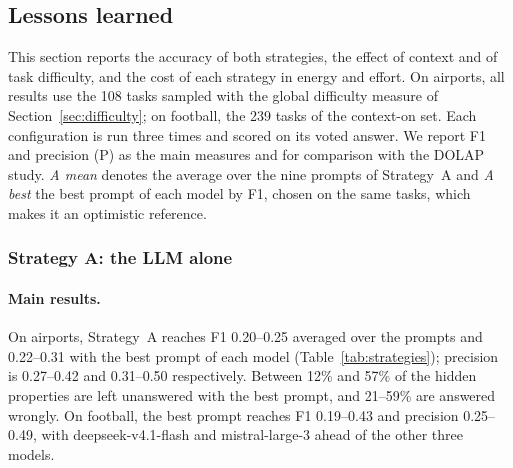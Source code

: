 
\subsection{Lessons learned}
\label{sec:lessons}

This section reports the accuracy of both strategies, the effect of context and of task difficulty, and the cost of
each strategy in energy and effort. On airports, all results use the 108 tasks sampled with the global difficulty measure
of Section~\ref{sec:difficulty}; on football, the 239 tasks of the context-on set. Each configuration is run three times and
scored on its voted answer. We report F1 and precision (P) as the main measures and \fign{} for comparison with the DOLAP
study. \emph{A mean} denotes the average over the nine prompts of Strategy~A and \emph{A best} the best prompt of each model
by F1, chosen on the same tasks, which makes it an optimistic reference.

\subsubsection{Strategy A: the LLM alone}

\paragraph{Main results.}
On airports, Strategy~A reaches F1 0.20--0.25 averaged over the prompts and 0.22--0.31 with the best prompt of each model
(Table~\ref{tab:strategies}); precision is 0.27--0.42 and 0.31--0.50 respectively. Between 12\% and 57\% of the hidden
properties are left unanswered with the best prompt, and 21--59\% are answered wrongly. On football, the best prompt reaches
F1 0.19--0.43 and precision 0.25--0.49, with deepseek-v4.1-flash and mistral-large-3 ahead of the other three models.


